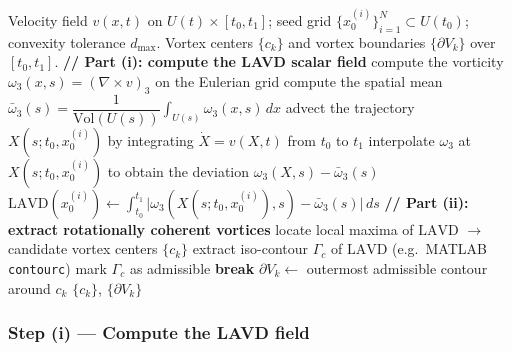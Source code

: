\documentclass[../main.tex]{subfiles}
\begin{document}
\begin{algorithm}[H]
\caption{LAVD vortex-detection toolbox (general structure).}
\label{alg:LAVD}
\begin{algorithmic}[1]
\Require Velocity field $v(x,t)$ on $U(t)\times[t_0,t_1]$; seed grid $\{x_0^{(i)}\}_{i=1}^{N}\subset U(t_0)$; convexity tolerance $d_{\max}$.
\Ensure Vortex centers $\{c_k\}$ and vortex boundaries $\{\partial V_k\}$ over $[t_0,t_1]$.
\Statex
\State \textbf{// Part (i): compute the LAVD scalar field}
    \State compute the vorticity $\omega_3(x,s) = (\nabla\times v)_3$ on the Eulerian grid
    \State compute the spatial mean $\bar\omega_3(s) = \dfrac{1}{\mathrm{Vol}(U(s))}\displaystyle\int_{U(s)}\omega_3(x,s)\,dx$
\EndFor
{}
    \State advect the trajectory $X(s;t_0,x_0^{(i)})$ by integrating $\dot X = v(X,t)$ from $t_0$ to $t_1$
    \State interpolate $\omega_3$ at $X(s;t_0,x_0^{(i)})$ to obtain the deviation $\omega_3(X,s)-\bar\omega_3(s)$
    \State $\mathrm{LAVD}(x_0^{(i)}) \gets \displaystyle\int_{t_0}^{t_1}\bigl|\omega_3(X(s;t_0,x_0^{(i)}),s)-\bar\omega_3(s)\bigr|\,ds$
\EndFor
\Statex
\State \textbf{// Part (ii): extract rotationally coherent vortices}
\State locate local maxima of $\mathrm{LAVD}$ $\to$ candidate vortex centers $\{c_k\}$
        \State extract iso-contour $\Gamma_c$ of $\mathrm{LAVD}$ (e.g.\ MATLAB \texttt{contourc})
            \State mark $\Gamma_c$ as admissible
        \Else
            \State \textbf{break} 
        \EndIf
    \EndFor
    \State $\partial V_k \gets$ outermost admissible contour around $c_k$
\EndFor
\State \Return $\{c_k\}$, $\{\partial V_k\}$
\end{algorithmic}
\end{algorithm}

\subsubsection*{Step (i) --- Compute the LAVD field}
\end{document}

